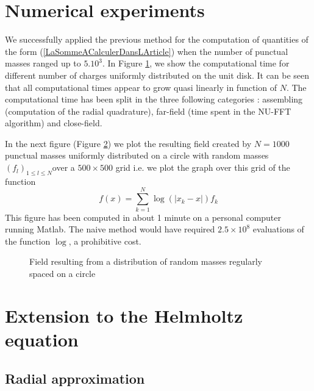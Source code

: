 \documentclass[11pt,a4paper]{article}
\begin{document}
\section{Numerical experiments}

We successfully applied the previous method for the computation of quantities of the form (\ref{LaSommeACalculerDansLArticle}) when the number of punctual masses ranged up to $5.10^3$. In Figure \ref{computationalTimeLaplace}, we show the computational time for different number of charges uniformly distributed on the unit disk. It can be seen that all computational times appear to grow quasi linearly in function of $N$. The computational time has been split in the three following categories : assembling (computation of the radial quadrature), far-field (time spent in the NU-FFT algorithm) and close-field.

\begin{figure}[H]
\label{computationalTimeLaplace}
\centering

\end{figure}

In the next figure (Figure \ref{LaplaceCircle}) we plot the resulting field created by $N = 1000$ punctual masses uniformly distributed on a circle with random masses $(f_l)_{1 \leq l \leq N} $over a $500\times500$ grid i.e. we plot the graph over this grid of the function 
\[ f(x) = \sum_{k=1}^N \log\left(|x_k - x|\right)f_k\]
This figure has been computed in about 1 minute on a personal computer running Matlab. The naive method would have required $2.5\times 10^8$ evaluations of the function $\log$, a prohibitive cost. 

\begin{figure}[H]
\centering
\label{LaplaceCircle}

\caption{Field resulting from a distribution of random masses regularly spaced on a circle}
\end{figure}


\section{Extension to the Helmholtz equation}
\afterpage{\clearpage}
\subsection{Radial approximation }
\end{document}
